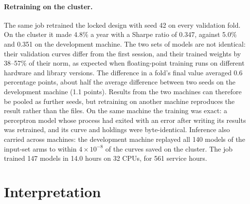 \paragraph{Retraining on the cluster.} The same job retrained the locked design with seed 42 on every
validation fold. On the cluster it made 4.8\% a year with a Sharpe ratio of 0.347, against 5.0\% and
0.351 on the development machine. The two sets of models are not identical: their validation curves
differ from the first session, and their trained weights by 38--57\% of their norm, as expected when
floating-point training runs on different hardware and library versions. The difference in a fold's
final value averaged 0.6 percentage points, about half the average difference between two seeds on the
development machine (1.1 points). Results from the two machines can therefore be pooled as further
seeds, but retraining on another machine reproduces the result rather than the files. On the same
machine the training was exact: a perceptron model whose process had exited with an error after
writing its results was retrained, and its curve and holdings were byte-identical. Inference also
carried across machines: the development machine replayed all 140 models of the input-set arms to within
$4\times10^{-8}$ of the curves saved on the cluster. The job trained 147 models in 14.0 hours on 32 CPUs,
for 561 service hours.

\section{Interpretation}
\label{sec:ext-interpretation}


